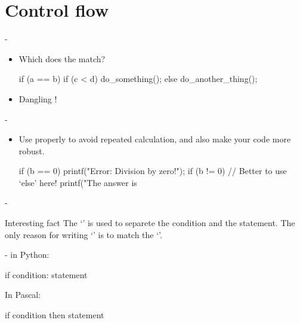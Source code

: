 \documentclass[handout]{beamer}
\begin{document}
\section{Control flow}

\begin{frame}[fragile]{-}
    \begin{itemize}
        \item Which  does the  match?
        \begin{cpp}
if (a == b)
    if (c < d)
        do_something();
else
    do_another_thing();
        \end{cpp}
        \pause
        \item Dangling !
    \end{itemize}
\end{frame}

\begin{frame}[fragile]{-}
    \begin{itemize}
        \item Use  properly to avoid repeated calculation, and also make your code more robust.
        \begin{cpp}
if (b == 0)
    printf("Error: Division by zero!\n");
if (b != 0) // Better to use `else' here!
    printf("The answer is %
        \end{cpp}
    \end{itemize}
\end{frame}

\begin{frame}[fragile]{-}
    \begin{alertblock}{Interesting fact}
        The `\ttt{)}' is used to separete the condition and the statement. The only reason for writing `\ttt{(}' is to match the `\ttt{)}'.
    \end{alertblock}
    - in Python:
    \begin{cpp}
if condition:
    statement
    \end{cpp}
    In Pascal:
    \begin{cpp}
if condition then
    statement
    \end{cpp}
\end{frame}
\end{document}
